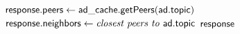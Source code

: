 \begin{algorithm}[]%
    \caption{%
        Lookup response algorithm run by registrars.
    }%
    \label{alg:registrar_register}%
    \begin{algorithmic}[1]%
        \footnotesize%
            \State $\mathsf{response.peers} \gets \mathsf{ad\_cache.getPeers}(\mathsf{ad.topic})$
            \State $\mathsf{response.neighbors} \gets \textit{closest peers to } \mathsf{ad.topic}$
            \State \Return $\mathsf{response}$
        \EndProcedure
    \end{algorithmic}%
\end{algorithm}%


